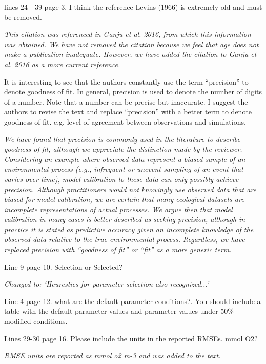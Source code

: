 \documentclass[letterpaper,12pt]{article}\usepackage[]{graphicx}\usepackage[]{color}
\begin{document}
lines 24 - 39 page 3. I think the reference Levins (1966) is extremely old and must be removed. 

{\it This citation was referenced in Ganju et al. 2016, from which this information was obtained.  We have not removed the citation because we feel that age does not make a publication inadequate.  However, we have added the citation to Ganju et al. 2016 as a more current reference.}

It is interesting to see that the authors constantly use the term ``precision'' to denote goodness of fit. In general, precision is used to denote the number of digits of a number. Note that a number can be precise but inaccurate. I suggest the authors to revise the text and replace ``precision'' with a better term to denote goodness of fit. e.g. level of agreement between observations and simulations. 

{\it We have found that precision is commonly used in the literature to describe goodness of fit, although we appreciate the distinction made by the reviewer.  Considering an example where observed data represent a biased sample of an environmental process (e.g., infrequent or unevent sampling of an event that varies over time), model calibration to these data can only possibly achieve precision.  Although practitioners would not knowingly use observed data that are biased for model calibration, we are certain that many ecological datasets are incomplete representations of actual processes.  We argue then that model calibration in many cases is better described as seeking precision, although in practice it is stated as predictive accuracy given an incomplete knowledge of the observed data relative to the true environmental process. Regardless, we have replaced precision with ``goodness of fit'' or ``fit'' as a more generic term.}

Line 9 page 10. Selection or Selected?

{\it Changed to: `Heurestics for parameter selection also recognized...'}

Line 4 page 12. what are the default parameter conditions?. You should include a table with the default parameter values and parameter values under 50\% modified conditions. 

Lines 29-30 page 16. Please include the units in the reported RMSEs. mmol O2?

{\it RMSE units are reported as mmol o2 m-3 and was added to the text.}
\end{document}
